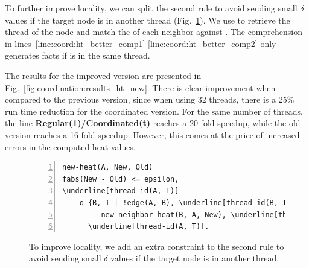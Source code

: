 To further improve locality, we can split the second rule to avoid sending small
$\delta$ values if the target node is in another thread
(Fig.~\ref{code:coord:ht_better}). We use  to retrieve the
thread  of the node  and match the  of each
neighbor  against . The comprehension in
lines~\ref{line:coord:ht_better_comp1}-\ref{line:coord:ht_better_comp2} only
generates  facts if  is in the same thread.

The results for the improved version are presented in
Fig.~\ref{fig:coordination:results_ht_new}. There is clear improvement when
compared to the previous version, since when using 32 threads, there is a 25\%
run time reduction for the coordinated version. For the same number of threads,
the line \textbf{Regular(1)/Coordinated(t)} reaches a 20-fold speedup, while the
old version reaches a 16-fold speedup. However, this comes at the price of
increased errors in the computed heat values.

\begin{figure}[h!]
\begin{Verbatim}[numbers=left,fontsize=\codesize,commandchars=\\\[\]]
new-heat(A, New, Old)
fabs(New - Old) <= epsilon,
\underline[thread-id(A, T)]
   -o {B, T | !edge(A, B), \underline[thread-id(B, T)] |\label[line:coord:ht_better_comp1]
         new-neighbor-heat(B, A, New), \underline[thread-id(B, T)]},\label[line:coord:ht_better_comp2]
      \underline[thread-id(A, T)].
\end{Verbatim}

  \caption{To improve locality, we add an extra constraint to the second rule to
     avoid sending small $\delta$ values if the target node is in another thread.}
  \label{code:coord:ht_better}
\end{figure}

